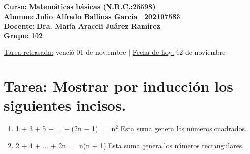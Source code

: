 \documentclass[12pt]{article}
\begin{document}
    \large{\bf{\textsf{Curso:}}} {\bfseries{{\textcolor{brightturquoise}{Matemáticas básicas \bfseries{(N.R.C.:25598)}}}}} \\
    \large{\bf{\textsf{Alumno:}}} {\bfseries{{\textcolor{prussianblue}{Julio Alfredo Ballinas García {\large{{$\mid$}}} 202107583}}}}  \\
    \large{\bf{\textsf{Docente:}}} {\bfseries{{\textcolor{wisteria}{Dra. María Araceli Juárez Ramírez}}}}\\
    \large{\bf{\textsf{Grupo:}}} {\bfseries{{\textcolor{verde_manzana}{102}}}}\\

\vfill
    
\begin{center} 

    {\small{\textsf{\underline{Tarea retrasada:} venció 01 de noviembre {}} {\LARGE{ $\mid$ }}\textsf{{\underline{Fecha de hoy:}} 02 de noviembre}}}
    
\end{center}

\newpage


\section*{Tarea: Mostrar por inducción los siguientes incisos.} \vspace{0.2cm}

\begin{enumerate}[label=(\alph*)]
    \item 1 $+$ 3 $+$ 5 $+$ $...$ $+$ (2n $-$ 1) $=$ n$^{2}$ \hspace{0.3cm} {\textcolor{Tahiti Gold}{Esta suma genera los números cuadrados.}} \vspace{0.2cm}
    
    \item 2 $+$ 4 $+$ $...$ $+$ 2n $=$ n(n $+$ 1) \hspace{0.3cm} {\textcolor{Tahiti Gold}{Esta suma genera los números rectangulares.}} \vspace{0.2cm}
\end{enumerate}



\hspace{0.1cm} 
	{
	} 
	
\end{document}
